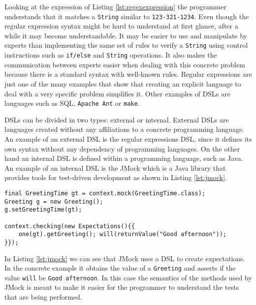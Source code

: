 \noindent
Looking at the expression of Listing \ref{lst:regexexpression} the programmer understands that it matches a \texttt{String} similar to \texttt{123-321-1234}. Even though the regular expression syntax might be hard to understand at first glance, after a while it may become understandable. It may be easier to use and manipulate by experts than implementing the same set of rules to verify a \texttt{String} using control instructions such as \texttt{if/else} and \texttt{String} operations. It also makes the communication between experts easier when dealing with this concrete problem because there is a standard syntax with well-known rules. Regular expressions are just one of the many examples that show that creating an explicit language to deal with a very specific problem simplifies it. Other examples of \ac{DSL}s are languages such as \ac{SQL}\cite{sql}, \texttt{Apache Ant}\cite{ant} or \texttt{make}\cite{make}. 

\noindent
\ac{DSL}s can be divided in two types: external or internal. External \ac{DSL}s are languages created without any affiliations to a concrete programming language. An example of an external \ac{DSL} is the regular expressions \ac{DSL}, since it defines its own syntax without any dependency of programming languages. On the other hand an internal \ac{DSL} is defined within a programming language, such as Java. An example of an internal \ac{DSL} is the JMock\cite{jmock} which is a Java library that provides tools for test-driven development as shown in Listing \ref{lst:jmock}. 

\bigskip


\begin{minipage}{\linewidth}
\begin{lstlisting}[caption={JMock Use Example}, label={lst:jmock}]
final GreetingTime gt = context.mock(GreetingTime.class);
Greeting g = new Greeting();
g.setGreetingTime(gt);

context.checking(new Expectations(){{
	one(gt).getGreeting(); will(returnValue("Good afternoon"));
}});
\end{lstlisting}
\end{minipage} 

\noindent
In Listing \ref{lst:jmock} we can see that JMock uses a \ac{DSL} to create expectations. In the concrete example it obtains the value of a \texttt{Greeting} and asserts if the value \texttt{will} be \texttt{Good afternoon}. In this case the semantics of the methods used by JMock is meant to make it easier for the programmer to understand the tests that are being performed.


